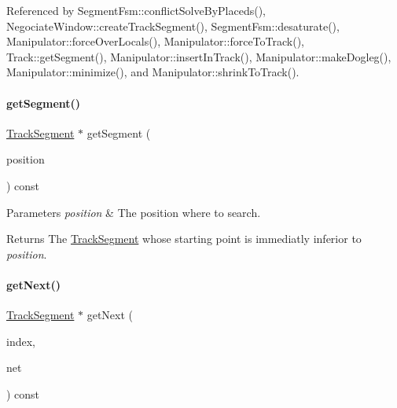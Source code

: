 Referenced by Segment\+Fsm\+::conflict\+Solve\+By\+Placeds(), Negociate\+Window\+::create\+Track\+Segment(), Segment\+Fsm\+::desaturate(), Manipulator\+::force\+Over\+Locals(), Manipulator\+::force\+To\+Track(), Track\+::get\+Segment(), Manipulator\+::insert\+In\+Track(), Manipulator\+::make\+Dogleg(), Manipulator\+::minimize(), and Manipulator\+::shrink\+To\+Track().

\mbox{\label{classKite_1_1Track_a6962a27db7ae946217ea692983fc6a8c}} 
\paragraph{\texorpdfstring{get\+Segment()}{getSegment()}\hspace{0.1cm}{\footnotesize\ttfamily [2/2]}}
{\footnotesize\ttfamily \mbox{\hyperlink{classKite_1_1TrackSegment}{Track\+Segment}} $\ast$ get\+Segment (\begin{DoxyParamCaption}\item[{\textbf{ Db\+U\+::\+Unit}}]{position }\end{DoxyParamCaption}) const}


\begin{DoxyParams}{Parameters}
{\em position} & The position where to search. \\
\hline
\end{DoxyParams}
\begin{DoxyReturn}{Returns}
The \mbox{\hyperlink{classKite_1_1TrackSegment}{Track\+Segment}} whose starting point is immediatly inferior to {\itshape position}. 
\end{DoxyReturn}
\mbox{\label{classKite_1_1Track_af3db59591bef3c690ace92c114a4e4aa}} 
\paragraph{\texorpdfstring{get\+Next()}{getNext()}}
{\footnotesize\ttfamily \mbox{\hyperlink{classKite_1_1TrackSegment}{Track\+Segment}} $\ast$ get\+Next (\begin{DoxyParamCaption}\item[{size\+\_\+t \&}]{index,  }\item[{\textbf{ Net} $\ast$}]{net }\end{DoxyParamCaption}) const}



